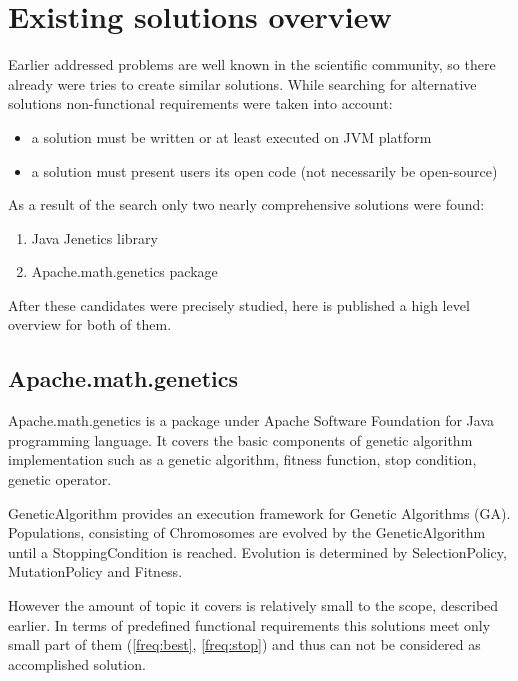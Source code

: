 \chapter{Existing solutions overview}

Earlier addressed problems are well known in the scientific community, so there already were tries to create similar solutions. While searching for alternative solutions non-functional requirements were taken into account:
\begin{itemize}

\item a solution must be written or at least executed on JVM platform 

\item a solution must present users its open code (not necessarily be open-source)
\end{itemize}

As a result of the search only two nearly comprehensive solutions were found: 
\begin{enumerate}
\item Java Jenetics library

\item Apache.math.genetics package
\end{enumerate}

After these candidates were precisely studied, here is published a high level overview for both of them.

\section{Apache.math.genetics}

Apache.math.genetics is a package under Apache Software Foundation for Java programming language. It covers the basic components of genetic algorithm implementation such as a genetic algorithm, fitness function, stop condition, genetic operator.

GeneticAlgorithm provides an execution framework for Genetic Algorithms (GA). Populations, consisting of Chromosomes are evolved by the GeneticAlgorithm until a StoppingCondition is reached. Evolution is determined by SelectionPolicy, MutationPolicy and Fitness. \cite{apache_genetics}

However the amount of topic it covers is relatively small to the scope, described earlier. In terms of predefined functional requirements this solutions meet only small part of them (\ref{freq:best}, \ref{freq:stop}) and thus can not be considered as accomplished solution.

